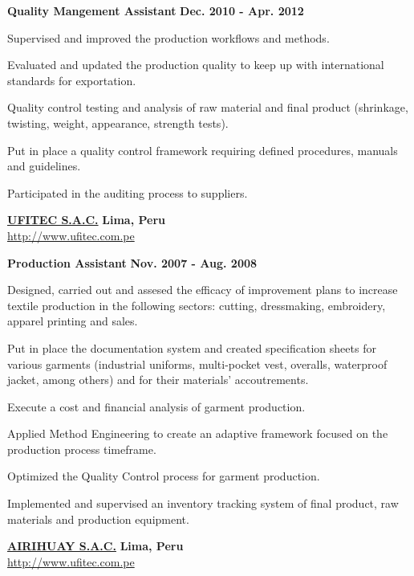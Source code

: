 \documentclass[10pt]{article}
\newenvironment{outerlist}[1][\enskip\textbullet]%
        {\begin{itemize}[#1]}{\end{itemize}%
         \vspace{-.6\baselineskip}}
\newenvironment{innerlist}[1][\enskip\textbullet]%
        {\begin{compactitem}[#1]}{\end{compactitem}}
\begin{document}
\begin{outerlist}
\item[] \textbf{Quality Mangement Assistant}
    \hfill \textbf{Dec. 2010 - Apr. 2012}
    \begin{innerlist}
        \item Supervised and improved the production workflows and methods. 
        \item Evaluated and updated the production quality to keep up with international standards for exportation.        
        \item Quality control testing and analysis of raw material and final product (shrinkage, twisting, weight, appearance, strength tests).
		\item Put in place a quality control framework requiring defined procedures, manuals and guidelines. 
		\item Participated in the auditing process to suppliers.\\ 
    \end{innerlist}
\end{outerlist}

\href{http://www.ufitec.com.pe}{\textbf{UFITEC S.A.C.}}
\hfill \textbf{Lima, Peru}\\
\href{http://www.ufitec.com.pe}{http://www.ufitec.com.pe}

\begin{outerlist}
\item[] \textbf{Production Assistant} 
    \hfill \textbf{Nov. 2007 - Aug. 2008}
    \begin{innerlist}
        \item Designed, carried out and assesed the efficacy of improvement plans to increase textile production in the following sectors: cutting, dressmaking, embroidery, apparel printing and sales. 
        \item Put in place the documentation system and created specification sheets for various garments (industrial uniforms, multi-pocket vest, overalls, waterproof jacket, among others) and for their materials' accoutrements.
		\item Execute a cost and financial analysis of garment production.
		\item Applied Method Engineering to create an adaptive framework focused on the production process timeframe.
		\item Optimized the Quality Control process for garment production.
		\item Implemented and supervised an inventory tracking system of final product, raw materials and production equipment.\\  
    \end{innerlist}
\end{outerlist}
\href{http://google.com}{\textbf{AIRIHUAY S.A.C.}}
\hfill \textbf{Lima, Peru}\\
\href{http://www.ufitec.com.pe}{http://www.ufitec.com.pe}
\end{document}
